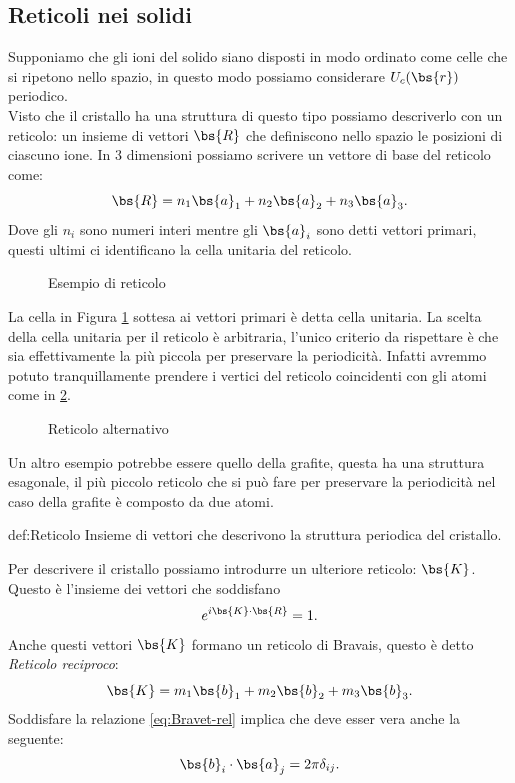 \subsection{Reticoli nei solidi}
\label{subsec:Reticoli nei solidi}
Supponiamo che gli ioni del solido siano disposti in modo ordinato come celle che si ripetono nello spazio, in questo modo possiamo considerare $U_c(\bs{r})$ periodico.\\
Visto che il cristallo ha una struttura di questo tipo possiamo descriverlo con un reticolo: un insieme di vettori $\bs{R}$ che definiscono nello spazio le posizioni di ciascuno ione. In 3 dimensioni possiamo scrivere un vettore di base del reticolo come:
\[
	\bs{R} = n_1 \bs{a}_1 + n_2 \bs{a}_2 + n_3 \bs{a}_3	
.\] 
Dove gli $n_i$ sono numeri interi mentre gli $\bs{a}_i$ sono detti vettori primari, questi ultimi ci identificano la cella unitaria del reticolo.
\begin{figure}[ht]
    \centering
    \caption{Esempio di reticolo}
    \label{fig:esempio-di-reticolo}
\end{figure}
La cella in Figura \ref{fig:esempio-di-reticolo} sottesa ai vettori primari è detta cella unitaria.
La scelta della cella unitaria per il reticolo è arbitraria, l'unico criterio da rispettare è che sia effettivamente la più piccola per preservare la periodicità. Infatti avremmo potuto tranquillamente prendere i vertici del reticolo coincidenti con gli atomi come in \ref{fig:reticolo-alternativo}.
\begin{figure}[ht]
    \centering
    \caption{Reticolo alternativo}
    \label{fig:reticolo-alternativo}
\end{figure}
Un altro esempio potrebbe essere quello della grafite, questa ha una struttura esagonale, il più piccolo reticolo che si può fare per preservare la periodicità nel caso della grafite è composto da due atomi.
\begin{defn}{def:Reticolo}
	Insieme di vettori che descrivono la struttura periodica del cristallo.
\end{defn}
Per descrivere il cristallo possiamo introdurre un ulteriore reticolo: $\bs{K}$. Questo è l'insieme dei vettori che soddisfano
\[
	e^{i \bs{K}\cdot\bs{R}}=1 \label{eq:Bravet-rel}
.\] 
Anche questi vettori $\bs{K}$ formano un reticolo di Bravais, questo è detto \textit{Reticolo reciproco}:
\[
	 \bs{K}=m_1\bs{b}_1 + m_2\bs{b}_2 + m_3\bs{b}_3
.\] 
Soddisfare la relazione \ref{eq:Bravet-rel} implica che deve esser vera anche la seguente:
\[
	\bs{b}_i \cdot  \bs{a}_j=2\pi\delta_{ij}
.\] 
